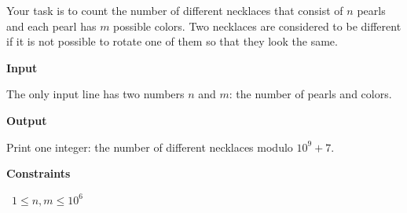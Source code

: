 Your task is to count the number of different necklaces that consist of $n$ pearls and each pearl has $m$ possible colors.
Two necklaces are considered to be different if it is not possible to rotate one of them so that they look the same.

\vspace{0.3cm}\noindent\textbf{Input}

The only input line has two numbers $n$ and $m$: the number of pearls and colors.

\vspace{0.3cm}\noindent\textbf{Output}

Print one integer: the number of different necklaces modulo $10^9+7$.

\vspace{0.3cm}\noindent\textbf{Constraints}

\textbullet\ $1 \le n,m \le 10^6$